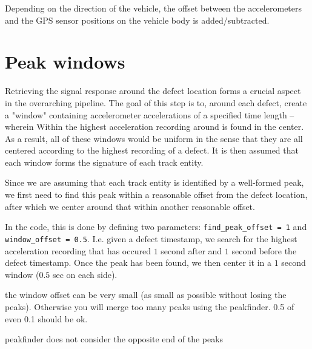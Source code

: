 Depending on the direction of the vehicle, the offset between the accelerometers and the GPS sensor positions on the vehicle body is added/subtracted.

\section{Peak windows}
Retrieving the signal response around the defect location forms a crucial aspect in the overarching pipeline. The goal of this step is to, around each defect, create a "window" containing accelerometer accelerations of a specified time length -- wherein Within the highest acceleration recording around is found in the center. As a result, all of these windows would be uniform in the sense that they are all centered according to the highest recording of a defect. It is then assumed that each window forms the signature of each track entity. 

Since we are assuming that each track entity is identified by a well-formed peak, we first need to find this peak within a reasonable offset from the defect location, after which we center around that within another reasonable offset. 

In the code, this is done by defining two parameters: \verb|find_peak_offset = 1| and \verb|window_offset = 0.5|. I.e. given a defect timestamp, we search for the highest acceleration recording that has occured $1$ second after and $1$ second before the defect timestamp. Once the peak has been found, we then center it in a $1$ second window ($0.5$ sec on each side).

the window offset can be very small (as small as possible without losing the peaks). Otherwise you will merge too many peaks using the peakfinder. 0.5 of even 0.1 should be ok. 

peakfinder does not consider the opposite end of the peaks




